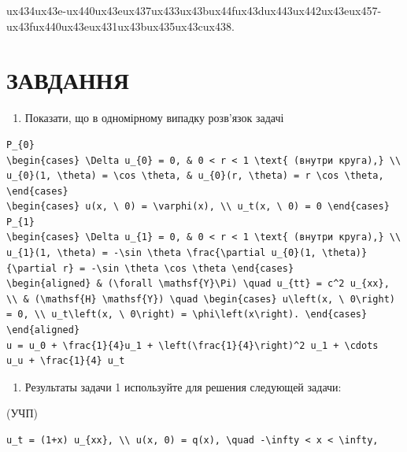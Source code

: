 \documentclass[
  ukrainian,
]{article}
\providecommand{\tightlist}{%
  \setlength{\itemsep}{0pt}\setlength{\parskip}{0pt}}
\begin{document}
{ux434ux43e-ux440ux43eux437ux433ux43bux44fux43dux443ux442ux43eux457-ux43fux440ux43eux431ux43bux435ux43cux438.}

\section{ЗАВДАННЯ}\label{ux437ux430ux432ux434ux430ux43dux43dux44f}

\begin{enumerate}
\def\labelenumi{\arabic{enumi}.}
\tightlist
\item
  Показати, що в одномірному випадку розв'язок задачі
\end{enumerate}

\begin{verbatim}
P_{0}
\begin{cases} \Delta u_{0} = 0, & 0 < r < 1 \text{ (внутри круга),} \\ u_{0}(1, \theta) = \cos \theta, & u_{0}(r, \theta) = r \cos \theta, \end{cases}
\begin{cases} u(x, \ 0) = \varphi(x), \\ u_t(x, \ 0) = 0 \end{cases}
P_{1}
\begin{cases} \Delta u_{1} = 0, & 0 < r < 1 \text{ (внутри круга),} \\ u_{1}(1, \theta) = -\sin \theta \frac{\partial u_{0}(1, \theta)}{\partial r} = -\sin \theta \cos \theta \end{cases}
\begin{aligned} & (\forall \mathsf{Y}\Pi) \quad u_{tt} = c^2 u_{xx}, \\ & (\mathsf{H} \mathsf{Y}) \quad \begin{cases} u\left(x, \ 0\right) = 0, \\ u_t\left(x, \ 0\right) = \phi\left(x\right). \end{cases} \end{aligned}
u = u_0 + \frac{1}{4}u_1 + \left(\frac{1}{4}\right)^2 u_1 + \cdots
u_u + \frac{1}{4} u_t
\end{verbatim}

\begin{enumerate}
\def\labelenumi{\arabic{enumi}.}
\setcounter{enumi}{1}
\tightlist
\item
  Результаты задачи 1 используйте для решения следующей задачи:
\end{enumerate}

(УЧП)

\begin{verbatim}
u_t = (1+x) u_{xx}, \\ u(x, 0) = q(x), \quad -\infty < x < \infty,
\end{verbatim}
\end{document}
